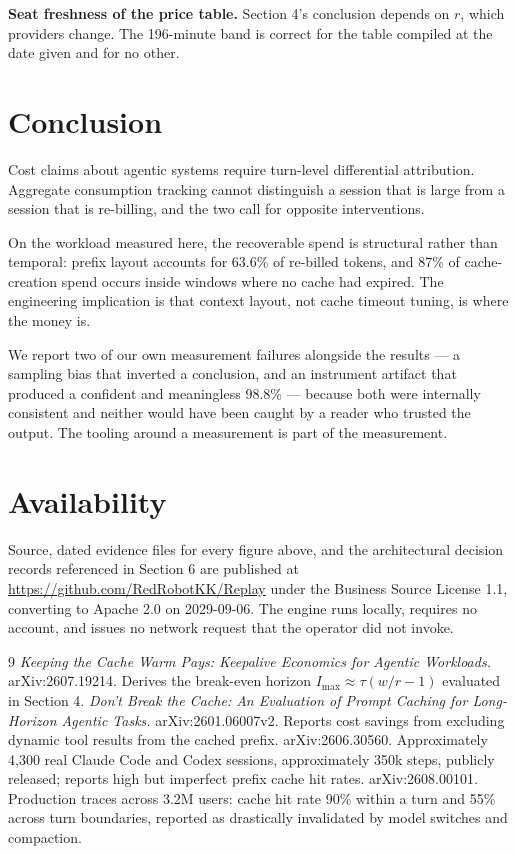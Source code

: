 \documentclass[11pt,twocolumn,letterpaper]{article}
\begin{document}
\textbf{Seat freshness of the price table.} Section 4's conclusion depends on
$r$, which providers change. The 196-minute band is correct for the table
compiled at the date given and for no other.

\section{Conclusion}

Cost claims about agentic systems require turn-level differential attribution.
Aggregate consumption tracking cannot distinguish a session that is large from
a session that is re-billing, and the two call for opposite interventions.

On the workload measured here, the recoverable spend is structural rather than
temporal: prefix layout accounts for 63.6\% of re-billed tokens, and 87\% of
cache-creation spend occurs inside windows where no cache had expired. The
engineering implication is that context layout, not cache timeout tuning, is
where the money is.

We report two of our own measurement failures alongside the results --- a
sampling bias that inverted a conclusion, and an instrument artifact that
produced a confident and meaningless 98.8\% --- because both were internally
consistent and neither would have been caught by a reader who trusted the
output. The tooling around a measurement is part of the measurement.

\section*{Availability}

Source, dated evidence files for every figure above, and the architectural
decision records referenced in Section 6 are published at
\url{https://github.com/RedRobotKK/Replay} under the Business Source License
1.1, converting to Apache 2.0 on 2029-09-06. The engine runs locally, requires
no account, and issues no network request that the operator did not invoke.

\small
\begin{thebibliography}{9}
 \emph{Keeping the Cache Warm Pays: Keepalive Economics for
  Agentic Workloads.} arXiv:2607.19214. Derives the break-even horizon
  $I_{\max} \approx \tau(w/r - 1)$ evaluated in Section 4.
 \emph{Don't Break the Cache: An Evaluation of Prompt
  Caching for Long-Horizon Agentic Tasks.} arXiv:2601.06007v2. Reports cost
  savings from excluding dynamic tool results from the cached prefix.
 arXiv:2606.30560. Approximately 4{,}300 real Claude Code and
  Codex sessions, approximately 350k steps, publicly released; reports high but
  imperfect prefix cache hit rates.
 arXiv:2608.00101. Production traces across 3.2M users:
  cache hit rate 90\% within a turn and 55\% across turn boundaries, reported as
  drastically invalidated by model switches and compaction.
\end{thebibliography}
\end{document}
